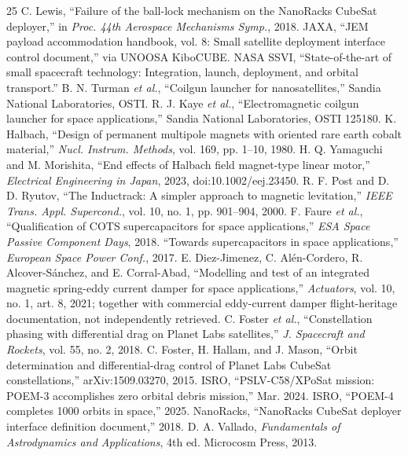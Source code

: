 \documentclass[conference]{IEEEtran}
\begin{document}
\begin{thebibliography}{25}
 C. Lewis, ``Failure of the ball-lock mechanism on the NanoRacks CubeSat deployer,'' in \emph{Proc. 44th Aerospace Mechanisms Symp.}, 2018.
 JAXA, ``JEM payload accommodation handbook, vol. 8: Small satellite deployment interface control document,'' via UNOOSA KiboCUBE.
 NASA SSVI, ``State-of-the-art of small spacecraft technology: Integration, launch, deployment, and orbital transport.''
 B. N. Turman \emph{et al.}, ``Coilgun launcher for nanosatellites,'' Sandia National Laboratories, OSTI.
 R. J. Kaye \emph{et al.}, ``Electromagnetic coilgun launcher for space applications,'' Sandia National Laboratories, OSTI 125180.
 K. Halbach, ``Design of permanent multipole magnets with oriented rare earth cobalt material,'' \emph{Nucl. Instrum. Methods}, vol. 169, pp. 1--10, 1980.
 H. Q. Yamaguchi and M. Morishita, ``End effects of Halbach field magnet-type linear motor,'' \emph{Electrical Engineering in Japan}, 2023, doi:10.1002/eej.23450.
 R. F. Post and D. D. Ryutov, ``The Inductrack: A simpler approach to magnetic levitation,'' \emph{IEEE Trans. Appl. Supercond.}, vol. 10, no. 1, pp. 901--904, 2000.
 F. Faure \emph{et al.}, ``Qualification of COTS supercapacitors for space applications,'' \emph{ESA Space Passive Component Days}, 2018.
 ``Towards supercapacitors in space applications,'' \emph{European Space Power Conf.}, 2017.
 E. Diez-Jimenez, C. Al\'en-Cordero, R. Alcover-S\'anchez, and E. Corral-Abad, ``Modelling and test of an integrated magnetic spring-eddy current damper for space applications,'' \emph{Actuators}, vol. 10, no. 1, art. 8, 2021; together with commercial eddy-current damper flight-heritage documentation, not independently retrieved.
 C. Foster \emph{et al.}, ``Constellation phasing with differential drag on Planet Labs satellites,'' \emph{J. Spacecraft and Rockets}, vol. 55, no. 2, 2018.
 C. Foster, H. Hallam, and J. Mason, ``Orbit determination and differential-drag control of Planet Labs CubeSat constellations,'' arXiv:1509.03270, 2015.
 ISRO, ``PSLV-C58/XPoSat mission: POEM-3 accomplishes zero orbital debris mission,'' Mar. 2024.
 ISRO, ``POEM-4 completes 1000 orbits in space,'' 2025.
 NanoRacks, ``NanoRacks CubeSat deployer interface definition document,'' 2018.
 D. A. Vallado, \emph{Fundamentals of Astrodynamics and Applications}, 4th ed. Microcosm Press, 2013.

\end{thebibliography}
\end{document}
